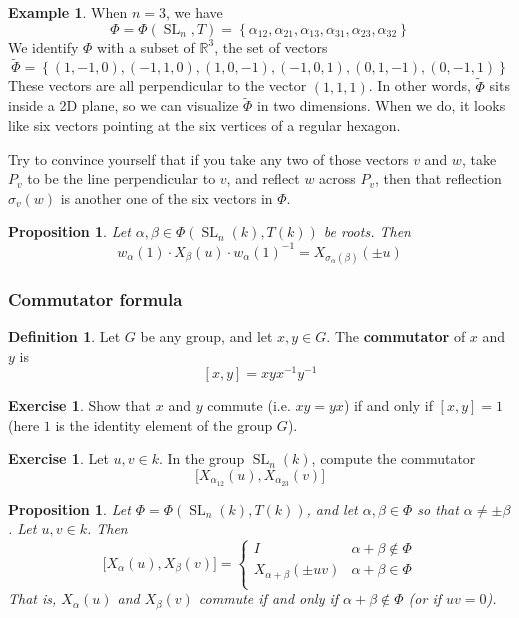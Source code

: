 \documentclass[12pt]{article}
\newtheorem{proposition}[theorem]{Proposition}
\theoremstyle{definition}
\newtheorem{definition}[theorem]{Definition}
\newtheorem{example}[theorem]{Example}
\newtheorem{exercise}[theorem]{Exercise}
\newcommand{\R}{\mathbb{R}}
\newcommand{\sig}{\sigma}
\newcommand{\lp}{\left(}
\newcommand{\rp}{\right)}
\newcommand{\lb}{\left\{}
\newcommand{\rb}{\right\}}
\newcommand{\tbf}{\textbf}
\newcommand{\inv}{^{-1}}
\newcommand{\wt}{\widetilde}
\DeclareMathOperator{\SL}{SL}
\begin{document}
\begin{example}
When $n= 3$, we have
\[
	\Phi = \Phi(\SL_n, T) = \lb \alpha_{12}, \alpha_{21}, \alpha_{13}, \alpha_{31}, \alpha_{23}, \alpha_{32} \rb
\]
We identify $\Phi$ with a subset of $\R^3$, the set of vectors
\[
	\wt \Phi = \lb (1,-1,0), (-1,1,0), (1,0,-1), (-1,0,1), (0,1,-1), (0,-1,1) \rb
\]
These vectors are all perpendicular to the vector $(1,1,1)$. In other words, $\wt \Phi$ sits inside a 2D plane, so we can visualize $\wt \Phi$ in two dimensions. When we do, it looks like six vectors pointing at the six vertices of a regular hexagon. 

Try to convince yourself that if you take any two of those vectors $v$ and $w$, take $P_v$ to be the line perpendicular to $v$, and reflect $w$ across $P_v$, then that reflection $\sig_v(w)$ is another one of the six vectors in $\Phi$.
\end{example}

\begin{proposition}
Let $\alpha, \beta \in \Phi(\SL_n(k), T(k))$ be roots. Then
\[
	w_\alpha(1) \cdot X_\beta(u) \cdot w_\alpha(1) \inv = X_{\sig_\alpha (\beta)} \lp \pm u \rp
\]
\end{proposition}

\subsubsection{Commutator formula}

\begin{definition}
Let $G$ be any group, and let $x,y \in G$. The \tbf{commutator} of $x$ and $y$ is
\[
	[x,y] = x y x \inv y \inv
\]
\end{definition}

\begin{exercise}
Show that $x$ and $y$ commute (i.e. $xy= yx$) if and only if $[x,y] = 1$ (here $1$ is the identity element of the group $G$).
\end{exercise}

\begin{exercise}
Let $u, v \in k$. In the group $\SL_n(k)$, compute the commutator
\[
	\Big[ X_{\alpha_{12}}(u), X_{\alpha_{23}}(v) \Big]
\]
\end{exercise}

\begin{proposition}
Let $\Phi = \Phi(\SL_n(k), T(k))$, and let $\alpha, \beta \in \Phi$ so that $\alpha \neq \pm \beta$. Let $u,v \in k$. Then
\[
	\Big[ X_\alpha(u), X_\beta(v) \Big] =
	\begin{cases}
		I & \alpha+\beta \not \in \Phi \\
		X_{\alpha+\beta}( \pm uv) & \alpha+\beta \in \Phi \\
	\end{cases}
\]
That is, $X_\alpha(u)$ and $X_\beta(v)$ commute if and only if $\alpha+\beta \not \in \Phi$ (or if $uv = 0$). 
\end{proposition}
\end{document}

